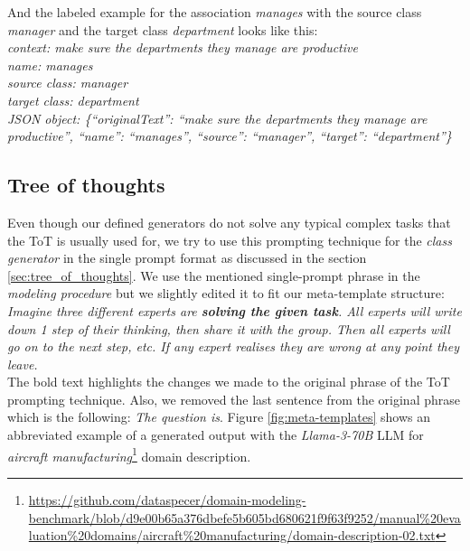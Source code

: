 \noindent{}And the labeled example for the association \textit{manages} with the source class \textit{manager} and the target class \textit{department} looks like this: \\

\noindent{}\textit{context: make sure the departments they manage are productive} \\
\textit{name: manages} \\
\textit{source class: manager} \\
\textit{target class: department} \\
\textit{JSON object: \{``originalText'': ``make sure the departments they manage are productive'', ``name'': ``manages'', ``source'': ``manager'', ``target'': ``department''\}}


\subsection{Tree of thoughts}

Even though our defined generators do not solve any typical complex tasks that the ToT is usually used for, we try to use this prompting technique for the \emph{class generator} in the single prompt format as discussed in the section \ref{sec:tree_of_thoughts}. We use the mentioned single-prompt phrase in the \emph{modeling procedure} but we slightly edited it to fit our meta-template structure: \\

\noindent{}\textit{Imagine three different experts are \textbf{solving the given task}. All experts will write down 1 step of their thinking, then share it with the group. Then all experts will go on to the next step, etc. If any expert realises they are wrong at any point they leave.} \\

\noindent{}The bold text highlights the changes we made to the original phrase of the ToT prompting technique. Also, we removed the last sentence from the original phrase which is the following: \textit{The question is}. Figure \ref{fig:meta-templates} shows an abbreviated example of a generated output with the \emph{Llama-3-70B} LLM for \textit{aircraft manufacturing}\footnote{\url{https://github.com/dataspecer/domain-modeling-benchmark/blob/d9e00b65a376dbefe5b605bd680621f9f63f9252/manual\%20evaluation\%20domains/aircraft\%20manufacturing/domain-description-02.txt}} domain description.


